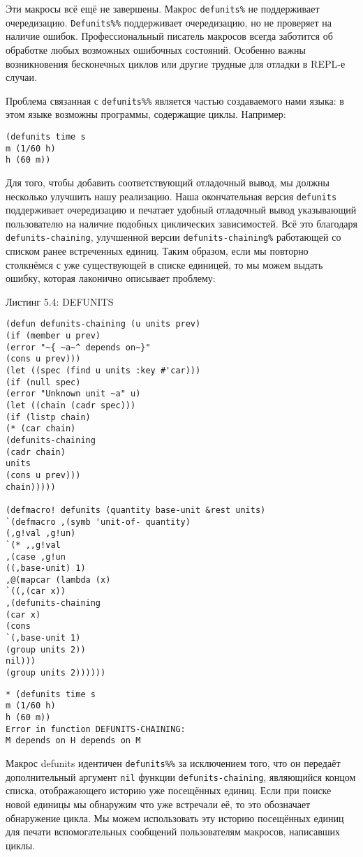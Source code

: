 Эти макросы всё ещё не завершены. Макрос \verb"defunits%" не поддерживает очередизацию. \verb"Defunits%%" поддерживает очередизацию, но не проверяет на наличие ошибок. Профессиональный писатель макросов всегда заботится об обработке любых возможных ошибочных состояний. Особенно важны возникновения бесконечных циклов или другие трудные для отладки в REPL-е случаи.

Проблема связанная с \verb"defunits%%" является частью создаваемого нами языка: в этом языке возможны программы, содержащие циклы. Например:

\begin{verbatim}
(defunits time s
m (1/60 h)
h (60 m))
\end{verbatim}

Для того, чтобы добавить соответствующий отладочный вывод, мы должны несколько улучшить нашу реализацию. Наша окончательная версия \verb"defunits" поддерживает очередизацию и печатает удобный отладочный вывод указывающий пользователю на наличие подобных циклических зависимостей. Всё это благодаря \verb"defunits-chaining", улучшенной версии \verb"defunits-chaining%" работающей со списком ранее встреченных единиц. Таким образом, если мы повторно столкнёмся с уже существующей в списке единицей, то мы можем выдать ошибку, которая лаконично описывает проблему:

Листинг 5.4: DEFUNITS\label{listing_5.4}
\listbegin
\begin{verbatim}
(defun defunits-chaining (u units prev)
(if (member u prev)
(error "~{ ~a~^ depends on~}"
(cons u prev)))
(let ((spec (find u units :key #'car)))
(if (null spec)
(error "Unknown unit ~a" u)
(let ((chain (cadr spec)))
(if (listp chain)
(* (car chain)
(defunits-chaining
(cadr chain)
units
(cons u prev)))
chain)))))

(defmacro! defunits (quantity base-unit &rest units)
`(defmacro ,(symb 'unit-of- quantity)
(,g!val ,g!un)
`(* ,,g!val
,(case ,g!un
((,base-unit) 1)
,@(mapcar (lambda (x)
`((,(car x))
,(defunits-chaining
(car x)
(cons
`(,base-unit 1)
(group units 2))
nil)))
(group units 2))))))
\end{verbatim}
\listend

\begin{verbatim}
* (defunits time s
m (1/60 h)
h (60 m))
Error in function DEFUNITS-CHAINING:
M depends on H depends on M
\end{verbatim}

Макрос defunits идентичен \verb"defunits%%" за исключением того, что он передаёт дополнительный аргумент \verb"nil" функции \verb"defunits-chaining", являющийся концом списка, отображающего историю уже посещённых единиц. Если при поиске новой единицы мы обнаружим что уже встречали её, то это обозначает обнаружение цикла. Мы можем использовать эту историю посещённых единиц для печати вспомогательных сообщений пользователям макросов, написавших циклы.

